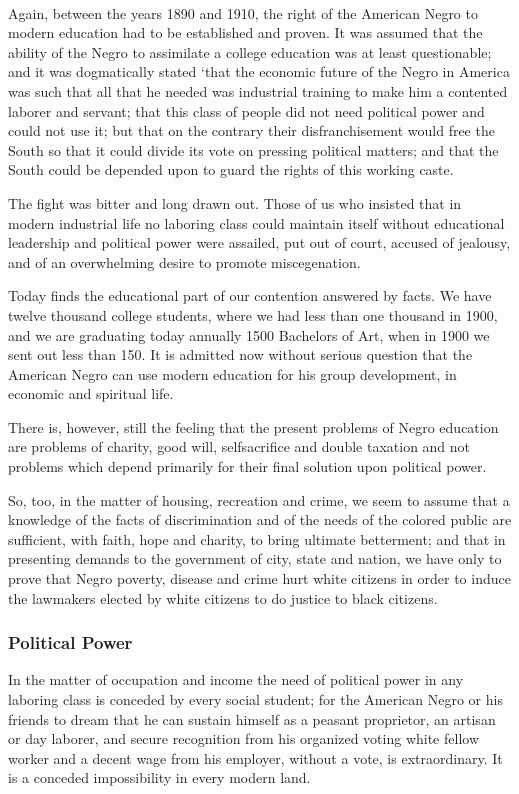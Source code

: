 \documentclass[letterpaper,10pt,english]{jupyterBook}
\begin{document}
\sphinxAtStartPar
 

\sphinxAtStartPar
Again, between the years 1890 and 1910, the right of the American Negro to modern education had to be established and proven. It was assumed that the ability of the Negro to assimilate a college education was at least questionable; and it was dogmatically stated ‘that the economic future of the Negro in America was such that all that he needed was industrial training to make him a contented laborer and servant; that this class of people did not need political power and could not use it; but that on the contrary their disfranchisement would free the South so that it could divide its vote on pressing political matters; and that the South could be depended upon to guard the rights of this working caste.

\sphinxAtStartPar
The fight was bitter and long drawn out. Those of us who insisted that in modern industrial life no laboring class could maintain itself without educational leadership and political power were assailed, put out of court, accused of jealousy, and of an overwhelming desire to promote miscegenation.

\sphinxAtStartPar
Today finds the educational part of our contention answered by facts. We have twelve thousand college students, where we had less than one thousand in 1900, and we are graduating today annually 1500 Bachelors of Art, when in 1900 we sent out less than 150. It is admitted now without serious question that the American Negro can use modern education for his group development, in economic and spiritual life.

\sphinxAtStartPar
There is, however, still the feeling that the present problems of Negro education are problems of charity, good will, self\sphinxhyphen{}sacrifice and double taxation and not problems which depend primarily for their final solution upon political power.

\sphinxAtStartPar
So, too, in the matter of housing, recreation and crime, we seem to assume that a knowledge of the facts of discrimination and of the needs of the colored public are sufficient, with faith, hope and charity, to bring ultimate betterment; and that in presenting demands to the government of city, state and nation, we have only to prove that Negro poverty, disease and crime hurt white citizens in order to induce the lawmakers elected by white citizens to do justice to black citizens.


\subsubsection{Political Power}
\label{\detokenize{Volumes/36/05/negro_citizen:political-power}}
\sphinxAtStartPar
In the matter of occupation and income the need of political power in any laboring class is conceded by every social student; for the American Negro or his friends to dream that he can sustain himself as a peasant proprietor, an artisan or day laborer, and secure recognition from his organized voting white fellow worker and a decent wage from his employer, without a vote, is extraordinary. It is a conceded impossibility in every modern land.
\end{document}
